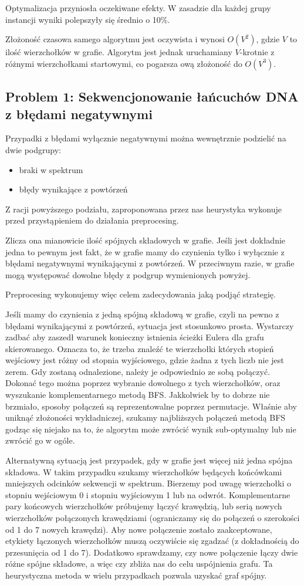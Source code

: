 \documentclass[a4paper]{article}
\begin{document}
Optymalizacja przyniosła oczekiwane efekty. W zasadzie dla każdej grupy instancji wyniki polepszyły się średnio o 10\%.

Złożoność czasowa samego algorytmu jest oczywista i wynosi $O(V^2)$, gdzie $V$ to ilość wierzchołków w grafie. Algorytm jest
jednak uruchamiany $V$-krotnie z różnymi wierzchołkami startowymi, co pogarsza ową złożoność do $O(V^3)$.

\subsection{Problem 1: Sekwencjonowanie łańcuchów DNA z błędami negatywnymi}
Przypadki z błędami wyłącznie negatywnymi można wewnętrznie podzielić na dwie podgrupy:
\begin{itemize}
\item braki w spektrum
\item błędy wynikające z powtórzeń
\end{itemize}
Z racji powyższego podziału, zaproponowana przez nas heurystyka wykonuje przed przystąpieniem do działania preprocesing.

Zlicza ona mianowicie ilość spójnych składowych w grafie. Jeśli jest dokładnie jedna to pewnym jest fakt, że w grafie
mamy do czynienia tylko i wyłącznie z błędami negatywnymi wynikającymi z powtórzeń. W przeciwnym razie, w grafie
mogą występować dowolne błędy z podgrup wymienionych powyżej.

Preprocesing wykonujemy więc celem zadecydowania jaką podjąć strategię.

Jeśli mamy do czynienia z jedną spójną składową w grafie, czyli na pewno z błędami wynikającymi z powtórzeń, sytuacja jest
stosunkowo prosta. Wystarczy zadbać aby zaszedł warunek konieczny istnienia ścieżki Eulera dla grafu skierowanego. 
Oznacza to, że trzeba znaleźć te wierzchołki których stopień wejściowy jest różny od stopnia wyjściowego, gdzie żadna
z tych liczb nie jest zerem. Gdy zostaną odnalezione, należy je odpowiednio ze sobą połączyć. Dokonać tego można poprzez
wybranie dowolnego z tych wierzchołków, oraz wyszukanie komplementarnego metodą BFS. Jakkolwiek by to dobrze nie brzmiało,
sposoby połączeń są reprezentowalne poprzez permutacje. Właśnie aby uniknąć złożoności wykładniczej, szukamy najbliższych
połączeń metodą BFS godząc się niejako na to, że algorytm może zwrócić wynik sub-optymalny lub nie zwrócić go w ogóle.

Alternatywną sytuacją jest przypadek, gdy w grafie jest więcej niż jedna spójna składowa. W takim przypadku
szukamy wierzchołków będących końcówkami mniejszych odcinków sekwencji w spektrum. Bierzemy pod uwagę wierzchołki o
stopniu wejściowym 0 i stopniu  wyjściowym 1 lub na odwrót. Komplementarne pary końcowych wierzchołków próbujemy
łączyć krawędzią, lub serią nowych wierzchołków połączonych krawędziami (ograniczamy się do połączeń o szerokości od 1
do 7 nowych krawędzi). Aby nowe połączenie zostało zaakceptowane, etykiety łączonych wierzchołków muszą oczywiście się
zgadzać (z dokładnością do przesunięcia od 1 do 7). Dodatkowo sprawdzamy, czy nowe połączenie łączy dwie różne
spójne składowe, a więc czy zbliża nas do celu uspójnienia grafu.
Ta heurystyczna metoda w wielu przypadkach pozwala uzyskać graf spójny.
\end{document}
